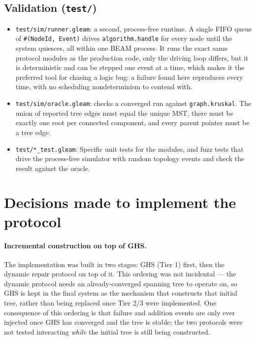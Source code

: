 \subsection{Validation (\texttt{test/})}

\begin{itemize}
  \item \texttt{test/sim/runner.gleam}: a second, process-free runtime. A single FIFO
  queue of \texttt{\#(NodeId, Event)} drives \texttt{algorithm.handle} for every node
  until the system quiesces, all within one BEAM process. It runs the exact same protocol
  modules as the production code, only the driving loop differs, but it is deterministic
  and can be stepped one event at a time, which makes it the preferred tool for chasing a
  logic bug: a failure found here reproduces every time, with no scheduling
  nondeterminism to contend with.
  \item \texttt{test/sim/oracle.gleam}: checks a converged run against
  \texttt{graph.kruskal}. The union of reported tree edges must equal the unique MST,
  there must be exactly one root per connected component, and every parent pointer must be
  a tree edge.
  \item \texttt{test/*\_test.gleam}: Specific unit tests for the modules, and fuzz tests that drive the process-free simulator with random topology events and check the result against the oracle.
\end{itemize}

\section{Decisions made to implement the protocol}

\paragraph{Incremental construction on top of GHS.}
The implementation was built in two stages: GHS (Tier 1) first, then the dynamic
repair protocol on top of it. This ordering was not incidental — the dynamic protocol
needs an already-converged spanning tree to operate on, so GHS is kept in the final
system as the mechanism that constructs that initial tree, rather than being replaced
once Tier 2/3 were implemented. One consequence of this ordering is that failure and
addition events are only ever injected once GHS has converged and the tree is stable;
the two protocols were not tested interacting \emph{while} the initial tree is still
being constructed.

